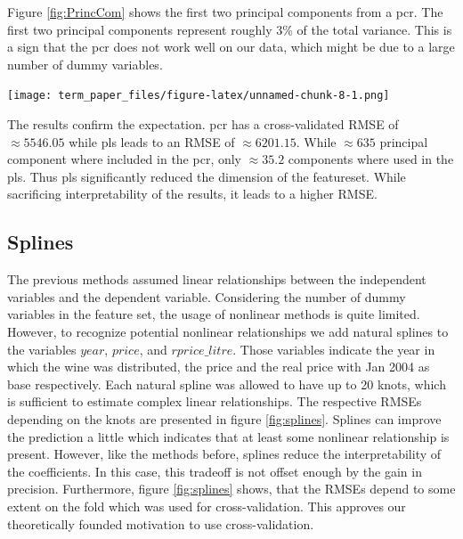 \documentclass[11pt,]{article}
\let\origfigure\figure
\let\endorigfigure\endfigure
\renewenvironment{figure}[1][2] {
    \expandafter\origfigure\expandafter[H]
} {
    \endorigfigure
}
\begin{document}
Figure \ref{fig:PrincCom} shows the first two principal components from
a \ac{pcr}. The first two principal components represent roughly 3\% of
the total variance. This is a sign that the \ac{pcr} does not work well
on our data, which might be due to a large number of dummy variables.

\begin{figure}
\centering
\texttt{[image: term\_paper\_files/figure-latex/unnamed-chunk-8-1.png]}
\caption{\label{fig:PrincCom}Principal Component One and Two.}
\end{figure}

The results confirm the expectation. \ac{pcr} has a cross-validated
\ac{RMSE} of \(\approx 5546.05\) while \ac{pls} leads to an \ac{RMSE} of
\(\approx 6201.15\). While \(\approx 635\) principal component where
included in the \ac{pcr}, only \(\approx 35.2\) components where used in
the \ac{pls}. Thus \ac{pls} significantly reduced the dimension of the
featureset. While sacrificing interpretability of the results, it leads
to a higher \ac{RMSE}.

\hypertarget{splines}{%
\subsection{Splines}\label{splines}}

The previous methods assumed linear relationships between the
independent variables and the dependent variable. Considering the number
of dummy variables in the feature set, the usage of nonlinear methods is
quite limited. However, to recognize potential nonlinear relationships
we add natural splines to the variables \(year\), \(price\), and
\(rprice\_litre\). Those variables indicate the year in which the wine
was distributed, the price and the real price with Jan 2004 as base
respectively. Each natural spline was allowed to have up to 20 knots,
which is sufficient to estimate complex linear relationships. The
respective \ac{RMSE}s depending on the knots are presented in figure
\ref{fig:splines}. Splines can improve the prediction a little which
indicates that at least some nonlinear relationship is present. However,
like the methods before, splines reduce the interpretability of the
coefficients. In this case, this tradeoff is not offset enough by the
gain in precision. Furthermore, figure \ref{fig:splines} shows, that the
\ac{RMSE}s depend to some extent on the fold which was used for
cross-validation. This approves our theoretically founded motivation to
use cross-validation.
\end{document}
